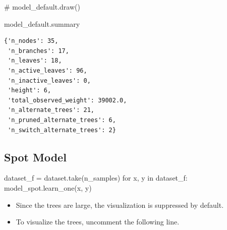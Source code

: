\documentclass[
  letterpaper,
  DIV=11,
  numbers=noendperiod]{scrreprt}
\newenvironment{Shaded}{\begin{snugshade}}{\end{snugshade}}
\newcommand{\CommentTok}[1]{\textcolor[rgb]{0.37,0.37,0.37}{#1}}
\newcommand{\ControlFlowTok}[1]{\textcolor[rgb]{0.00,0.23,0.31}{#1}}
\newcommand{\KeywordTok}[1]{\textcolor[rgb]{0.00,0.23,0.31}{#1}}
\newcommand{\NormalTok}[1]{\textcolor[rgb]{0.00,0.23,0.31}{#1}}
\newcommand{\OperatorTok}[1]{\textcolor[rgb]{0.37,0.37,0.37}{#1}}
\providecommand{\tightlist}{%
  \setlength{\itemsep}{0pt}\setlength{\parskip}{0pt}}\usepackage{longtable,booktabs,array}
\begin{document}
\begin{Shaded}
\begin{Highlighting}[]
\CommentTok{\# model\_default.draw()}
\end{Highlighting}
\end{Shaded}

\begin{Shaded}
\begin{Highlighting}[]
\NormalTok{model\_default.summary}
\end{Highlighting}
\end{Shaded}

\begin{verbatim}
{'n_nodes': 35,
 'n_branches': 17,
 'n_leaves': 18,
 'n_active_leaves': 96,
 'n_inactive_leaves': 0,
 'height': 6,
 'total_observed_weight': 39002.0,
 'n_alternate_trees': 21,
 'n_pruned_alternate_trees': 6,
 'n_switch_alternate_trees': 2}
\end{verbatim}

\subsection{Spot Model}\label{spot-model}

\begin{Shaded}
\begin{Highlighting}[]
\NormalTok{dataset\_f }\OperatorTok{=}\NormalTok{ dataset.take(n\_samples)}
\ControlFlowTok{for}\NormalTok{ x, y }\KeywordTok{in}\NormalTok{ dataset\_f:}
\NormalTok{    model\_spot.learn\_one(x, y)}
\end{Highlighting}
\end{Shaded}

\begin{tcolorbox}[enhanced jigsaw, coltitle=black, bottomrule=.15mm, breakable, toprule=.15mm, colframe=quarto-callout-caution-color-frame, title=\textcolor{quarto-callout-caution-color}{\faFire}\hspace{0.5em}{Caution: Large Trees}, colbacktitle=quarto-callout-caution-color!10!white, opacityback=0, left=2mm, leftrule=.75mm, colback=white, rightrule=.15mm, bottomtitle=1mm, toptitle=1mm, titlerule=0mm, arc=.35mm, opacitybacktitle=0.6]

\begin{itemize}
\tightlist
\item
  Since the trees are large, the visualization is suppressed by default.
\item
  To visualize the trees, uncomment the following line.
\end{itemize}

\end{tcolorbox}
\end{document}
